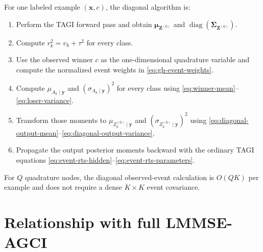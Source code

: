\documentclass[11pt]{article}
\newcommand{\diag}{\operatorname{diag}}
\newcommand{\Olayer}{\mathtt{O}}
\begin{document}
For one labeled example $(\bm x,c)$, the diagonal algorithm is:
\begin{enumerate}
 \item Perform the TAGI forward pass and obtain
 $\bm\mu_{\bm Z^{(\Olayer)}}$ and
 $\diag(\bm\Sigma_{\bm Z^{(\Olayer)}})$.

 \item Compute $r_k^2=v_k+\tau^2$ for every class.

 \item Use the observed winner $c$ as the one-dimensional quadrature variable
 and compute the normalized event weights in
 \eqref{eq:gh-event-weights}.

 \item Compute $\mu_{A_k\mid\bm y}$ and
 $(\sigma_{A_k\mid\bm y})^2$ for every class using
 \eqref{eq:winner-mean}--\eqref{eq:loser-variance}.

 \item Transform those moments to
 $\mu_{Z_k^{(\Olayer)}\mid\bm y}$ and
 $(\sigma_{Z_k^{(\Olayer)}\mid\bm y})^2$ using
 \eqref{eq:diagonal-output-mean}--\eqref{eq:diagonal-output-variance}.

 \item Propagate the output posterior moments backward with the ordinary TAGI
 equations \eqref{eq:event-rts-hidden}--\eqref{eq:event-rts-parameters}.
\end{enumerate}
For $Q$ quadrature nodes, the diagonal observed-event calculation is
$O(QK)$ per example and does not require a dense $K\times K$ event covariance.

\section{Relationship with full LMMSE-AGCI}
\end{document}
